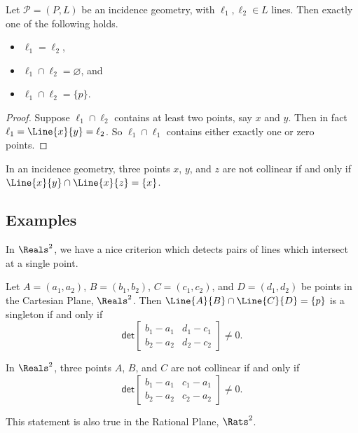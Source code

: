 \documentclass{article}
\begin{document}
\begin{prop}
Let $\mathcal{P} = (P,L)$ be an incidence geometry, with $\ell_1, \ell_2 \in L$ lines. Then exactly one of the following holds.
\begin{itemize}
\item $\ell_1 = \ell_2$,
\item $\ell_1 \cap \ell_2 = \varnothing$, and
\item $\ell_1 \cap \ell_2 = \{p\}$.
\end{itemize}
\end{prop}

\begin{proof}
Suppose $\ell_1 \cap \ell_2$ contains at least two points, say $x$ and $y$. Then in fact $\ell_1 = \Line{x}{y} = \ell_2$. So $\ell_1 \cap \ell_1$ contains either exactly one or zero points.
\end{proof}

\begin{cor}
In an incidence geometry, three points $x$, $y$, and $z$ are not collinear if and only if $\Line{x}{y} \cap \Line{x}{z} = \{x\}$.
\end{cor}



\subsection*{Examples}

In $\Reals^2$, we have a nice criterion which detects pairs of lines which intersect at a single point.

\begin{prop}
Let $A = (a_1,a_2)$, $B = (b_1,b_2)$, $C = (c_1,c_2)$, and $D = (d_1,d_2)$ be points in the Cartesian Plane, $\Reals^2$. Then $\Line{A}{B} \cap \Line{C}{D} = \{p\}$ is a singleton if and only if \[ \mathsf{det} \begin{bmatrix} b_1 - a_1 & d_1 - c_1 \\ b_2 - a_2 & d_2 - c_2 \end{bmatrix} \neq 0. \]
\end{prop}

\begin{cor}
In $\Reals^2$, three points $A$, $B$, and $C$ are not collinear if and only if \[ \mathsf{det} \begin{bmatrix} b_1 - a_1 & c_1 - a_1 \\ b_2 - a_2 & c_2 - a_2 \end{bmatrix} \neq 0. \]
\end{cor}

\begin{cor}
This statement is also true in the Rational Plane, $\Rats^2$.
\end{cor}
\end{document}

